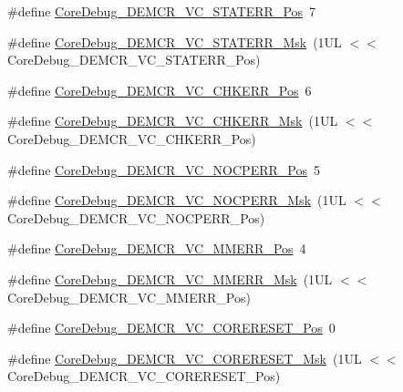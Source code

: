 \begin{DoxyCompactItemize}
\item 
\#define \hyperlink{group___c_m_s_i_s___core_debug_ga16f0d3d2ce1e1e8cd762d938ac56c4ac}{Core\+Debug\+\_\+\+D\+E\+M\+C\+R\+\_\+\+V\+C\+\_\+\+S\+T\+A\+T\+E\+R\+R\+\_\+\+Pos}~7
\item 
\#define \hyperlink{group___c_m_s_i_s___core_debug_gaa38b947d77672c48bba1280c0a642e19}{Core\+Debug\+\_\+\+D\+E\+M\+C\+R\+\_\+\+V\+C\+\_\+\+S\+T\+A\+T\+E\+R\+R\+\_\+\+Msk}~(1\+U\+L $<$$<$ Core\+Debug\+\_\+\+D\+E\+M\+C\+R\+\_\+\+V\+C\+\_\+\+S\+T\+A\+T\+E\+R\+R\+\_\+\+Pos)
\item 
\#define \hyperlink{group___c_m_s_i_s___core_debug_ga10fc7c53bca904c128bc8e1a03072d50}{Core\+Debug\+\_\+\+D\+E\+M\+C\+R\+\_\+\+V\+C\+\_\+\+C\+H\+K\+E\+R\+R\+\_\+\+Pos}~6
\item 
\#define \hyperlink{group___c_m_s_i_s___core_debug_ga2f98b461d19746ab2febfddebb73da6f}{Core\+Debug\+\_\+\+D\+E\+M\+C\+R\+\_\+\+V\+C\+\_\+\+C\+H\+K\+E\+R\+R\+\_\+\+Msk}~(1\+U\+L $<$$<$ Core\+Debug\+\_\+\+D\+E\+M\+C\+R\+\_\+\+V\+C\+\_\+\+C\+H\+K\+E\+R\+R\+\_\+\+Pos)
\item 
\#define \hyperlink{group___c_m_s_i_s___core_debug_gac9d13eb2add61f610d5ced1f7ad2adf8}{Core\+Debug\+\_\+\+D\+E\+M\+C\+R\+\_\+\+V\+C\+\_\+\+N\+O\+C\+P\+E\+R\+R\+\_\+\+Pos}~5
\item 
\#define \hyperlink{group___c_m_s_i_s___core_debug_ga03ee58b1b02fdbf21612809034562f1c}{Core\+Debug\+\_\+\+D\+E\+M\+C\+R\+\_\+\+V\+C\+\_\+\+N\+O\+C\+P\+E\+R\+R\+\_\+\+Msk}~(1\+U\+L $<$$<$ Core\+Debug\+\_\+\+D\+E\+M\+C\+R\+\_\+\+V\+C\+\_\+\+N\+O\+C\+P\+E\+R\+R\+\_\+\+Pos)
\item 
\#define \hyperlink{group___c_m_s_i_s___core_debug_ga444454f7c7748e76cd76c3809c887c41}{Core\+Debug\+\_\+\+D\+E\+M\+C\+R\+\_\+\+V\+C\+\_\+\+M\+M\+E\+R\+R\+\_\+\+Pos}~4
\item 
\#define \hyperlink{group___c_m_s_i_s___core_debug_gad420a9b60620584faaca6289e83d3a87}{Core\+Debug\+\_\+\+D\+E\+M\+C\+R\+\_\+\+V\+C\+\_\+\+M\+M\+E\+R\+R\+\_\+\+Msk}~(1\+U\+L $<$$<$ Core\+Debug\+\_\+\+D\+E\+M\+C\+R\+\_\+\+V\+C\+\_\+\+M\+M\+E\+R\+R\+\_\+\+Pos)
\item 
\#define \hyperlink{group___c_m_s_i_s___core_debug_ga9fcf09666f7063a7303117aa32a85d5a}{Core\+Debug\+\_\+\+D\+E\+M\+C\+R\+\_\+\+V\+C\+\_\+\+C\+O\+R\+E\+R\+E\+S\+E\+T\+\_\+\+Pos}~0
\item 
\#define \hyperlink{group___c_m_s_i_s___core_debug_ga906476e53c1e1487c30f3a1181df9e30}{Core\+Debug\+\_\+\+D\+E\+M\+C\+R\+\_\+\+V\+C\+\_\+\+C\+O\+R\+E\+R\+E\+S\+E\+T\+\_\+\+Msk}~(1\+U\+L $<$$<$ Core\+Debug\+\_\+\+D\+E\+M\+C\+R\+\_\+\+V\+C\+\_\+\+C\+O\+R\+E\+R\+E\+S\+E\+T\+\_\+\+Pos)
\end{DoxyCompactItemize}


